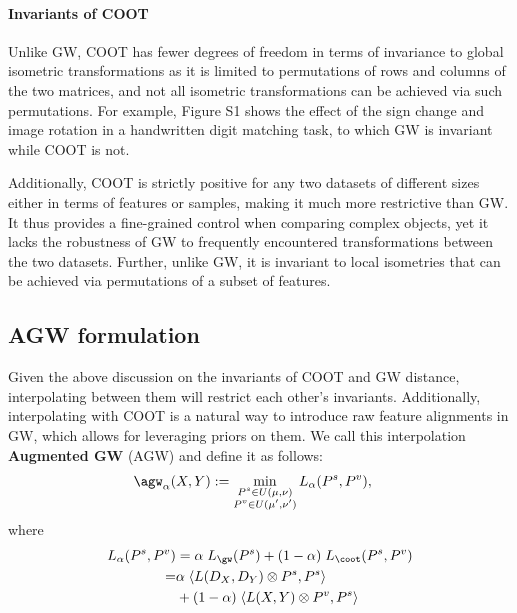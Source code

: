 \paragraph{Invariants of COOT} Unlike GW, COOT has fewer degrees of freedom
in terms of invariance to global isometric transformations as it is limited to
permutations of rows and columns of the two matrices, and not all isometric transformations
can be achieved via such permutations. For example, Figure S1 shows the effect of the sign change
and image rotation in a handwritten digit matching task, to which GW is invariant while COOT is not.

Additionally, COOT is strictly positive for any two datasets of different sizes either
in terms of features or samples, making it much more restrictive than GW.
It thus provides a fine-grained control when comparing complex objects,
yet it lacks the robustness of GW to frequently encountered transformations
between the two datasets. Further, unlike GW, it is invariant to local isometries
that can be achieved via permutations of a subset of features.

\subsection{AGW formulation}
Given the above discussion on the invariants of COOT and GW distance,
interpolating between them will restrict each other's invariants. Additionally,
interpolating with COOT is a natural way to introduce raw feature alignments in GW,
which allows for leveraging priors on them.
We call this interpolation \textbf{Augmented GW} (AGW) and define it as follows:
\begin{align}
\label{eq:scootr}
\agw_{\alpha}(X, Y) &:=
\min_{\substack{P^s \in U(\mu,\nu) \\ P^v \in U(\mu',\nu')}} L_{\alpha}(P^s, P^v),
\end{align}
where
\begin{align*}
    L_{\alpha}(P^s, P^v) &= \alpha \; L_{\gw} (P^s) + (1-\alpha) \; L_{\coot} (P^s, P^v) \\
    =& \alpha \; \langle L(D_X,D_Y)\otimes P^s,P^s \rangle \\
    &+ (1-\alpha) \; \langle L(X,Y) \otimes P^v,P^s \rangle
\end{align*}

